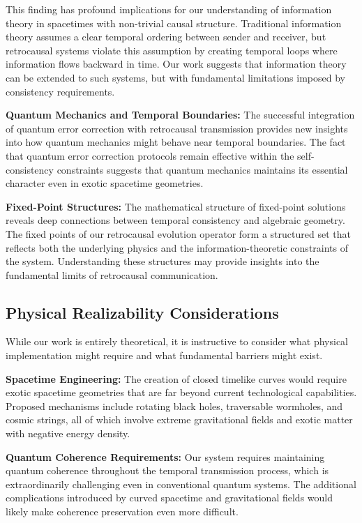 \documentclass[12pt,a4paper]{article}
\begin{document}
This finding has profound implications for our understanding of information theory in spacetimes with non-trivial causal structure. Traditional information theory assumes a clear temporal ordering between sender and receiver, but retrocausal systems violate this assumption by creating temporal loops where information flows backward in time. Our work suggests that information theory can be extended to such systems, but with fundamental limitations imposed by consistency requirements.

\textbf{Quantum Mechanics and Temporal Boundaries:} The successful integration of quantum error correction with retrocausal transmission provides new insights into how quantum mechanics might behave near temporal boundaries. The fact that quantum error correction protocols remain effective within the self-consistency constraints suggests that quantum mechanics maintains its essential character even in exotic spacetime geometries.

\textbf{Fixed-Point Structures:} The mathematical structure of fixed-point solutions reveals deep connections between temporal consistency and algebraic geometry. The fixed points of our retrocausal evolution operator form a structured set that reflects both the underlying physics and the information-theoretic constraints of the system. Understanding these structures may provide insights into the fundamental limits of retrocausal communication.

\subsection{Physical Realizability Considerations}

While our work is entirely theoretical, it is instructive to consider what physical implementation might require and what fundamental barriers might exist.

\textbf{Spacetime Engineering:} The creation of closed timelike curves would require exotic spacetime geometries that are far beyond current technological capabilities. Proposed mechanisms include rotating black holes, traversable wormholes, and cosmic strings, all of which involve extreme gravitational fields and exotic matter with negative energy density.

\textbf{Quantum Coherence Requirements:} Our system requires maintaining quantum coherence throughout the temporal transmission process, which is extraordinarily challenging even in conventional quantum systems. The additional complications introduced by curved spacetime and gravitational fields would likely make coherence preservation even more difficult.
\end{document}
